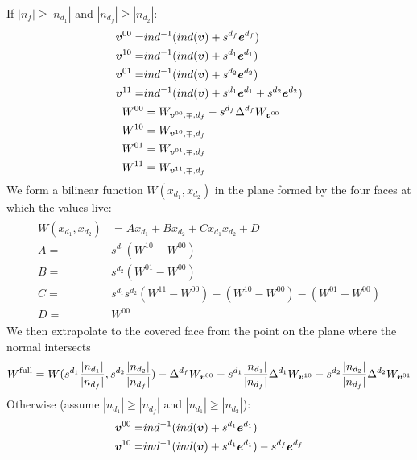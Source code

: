 \begin{enumerate}
If $|n_f| \ge |n_{d_1}|$ and $|n_{d_f}| \ge |n_{d_2}|$:
\begin{align}
\begin{split}
{\boldsymbol{v}}^{00} =& ind^{-1}(ind({\boldsymbol{v}})+ s^{d_f} {\boldsymbol{e}}^{d_f})\\
{\boldsymbol{v}}^{10} =& ind^{-1}(ind({\boldsymbol{v}})+ s^{d_1} {\boldsymbol{e}}^{d_1})\\
{\boldsymbol{v}}^{01} =& ind^{-1}(ind({\boldsymbol{v}})+ s^{d_2} {\boldsymbol{e}}^{d_2})\\
{\boldsymbol{v}}^{11} =& ind^{-1}(ind({\boldsymbol{v}})+ s^{d_1} {\boldsymbol{e}}^{d_1} 
                                   + s^{d_2} {\boldsymbol{e}}^{d_2})  \\
W^{00} &=  W_{{\boldsymbol{v}}^{00},\mp,d_f} - s^{d_f} \Delta^{d_f}W_{{\boldsymbol{v}}^{00}} \\ 
W^{10} &=  W_{{\boldsymbol{v}}^{10},\mp,d_f} \\
W^{01} &=  W_{{\boldsymbol{v}}^{01},\mp,d_f} \\
W^{11} &=  W_{{\boldsymbol{v}}^{11},\mp,d_f} 
\end{split}
\end{align}
We form a bilinear function $W(x_{d_1}, x_{d_2})$ in the plane formed
by the four  faces at which the values live:
\begin{align}
\begin{split}
W(x_{d_1}, x_{d_2}) &= A x_{d_1} + B x_{d_2} + C  x_{d_1} x_{d_2}+D \\
A =& s^{d_1} (W^{10}-W^{00}) \\
B =& s^{d_2} (W^{01}-W^{00}) \\
C =& s^{d_1} s^{d_2} (W^{11}-W^{00}) - (W^{10}-W^{00}) - (W^{01}-W^{00}) \\
D =& W^{00} 
\end{split}
\label{eqn::bilinear}
\end{align}
We then extrapolate to the covered face from the point on the plane
where the normal intersects
\begin{equation}
W^{\text{full}} = W(s^{d_1} \frac{|n_{d_1}|}{|n_{d_f}|} ,s^{d_2}
\frac{|n_{d_2}|}{|n_{d_f}|}) -  \Delta^{d_f}W_{{\boldsymbol{v}}^{00}} 
- s^{d_1}\frac{|n_{d_1}|}{|n_{d_f}|} \Delta^{d_1}W_{{\boldsymbol{v}}^{10}} 
- s^{d_2}\frac{|n_{d_2}|}{|n_{d_f}|} \Delta^{d_2}W_{{\boldsymbol{v}}^{01}} 
\end{equation}
Otherwise (assume $|n_{d_1}| \ge |n_{d_f}|$ and $|n_{d_1}| \ge |n_{d_2}|$):
\begin{align}
\begin{split}
\vbold^{00} =& ind^{-1}(ind(\vbold)+ s^{d_1} \ebold^{d_1})\\
\vbold^{10} =& ind^{-1}(ind(\vbold)+ s^{d_1} \ebold^{d_1}) - s^{d_f} \ebold^{d_f}\\

\end{split}
\end{align}
\end{enumerate}
